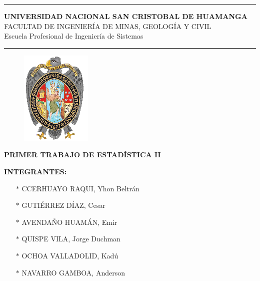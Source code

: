 \documentclass[a4paper,openright,12pt]{book}
\author{jhon ccerhuayo raqui}
\begin{document}
	
	\thispagestyle{empty} 
	
	\pagestyle{fancy}
\begin{center}
\rule{150mm}{0.3mm}\vspace{7mm}

\textbf{\Large UNIVERSIDAD NACIONAL SAN CRISTOBAL DE HUAMANGA}\\
\large FACULTAD DE INGENIERÍA DE MINAS, GEOLOGÍA Y CIVIL\\
\Large Escuela Profesional de Ingeniería de Sistemas
\rule{150mm}{0.3mm}

\vspace{7mm}

\begin{figure}[h]
	\centering
	\includegraphics[width=0.5\linewidth, height=0.4\textheight]{logo-128x170}
	\label{fig:logo-128x170}
\end{figure}
\vspace{1mm}
\Large \textbf{PRIMER TRABAJO DE ESTADÍSTICA II}\vspace{3mm}
\end{center}
\textbf{\large INTEGRANTES:}\\
\begin{itemize}
	\item[$*$] CCERHUAYO RAQUI, Yhon Beltrán
	\item[$*$] GUTIÉRREZ DÍAZ, Cesar
	\item[$*$] AVENDAÑO HUAMÁN, Emir
	\item[$*$] QUISPE VILA, Jorge Duchman
	\item[$*$] OCHOA VALLADOLID, Kadú
	\item[$*$] NAVARRO GAMBOA, Anderson
\end{itemize}
\end{document}
